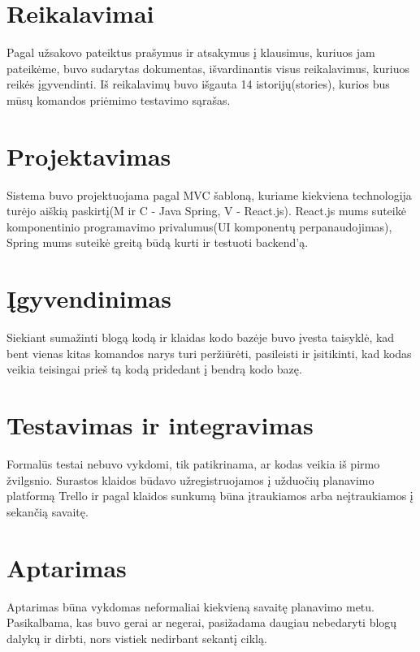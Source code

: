 \documentclass{VUMIFInfKursinis}
\begin{document}
\section{Reikalavimai}
Pagal užsakovo pateiktus prašymus ir atsakymus į klausimus, kuriuos jam pateikėme, buvo sudarytas dokumentas, išvardinantis visus reikalavimus, kuriuos reikės įgyvendinti. Iš reikalavimų buvo išgauta 14 istorijų(stories), kurios bus mūsų komandos priėmimo testavimo sąrašas.
\section{Projektavimas}
Sistema buvo projektuojama pagal MVC šabloną, kuriame kiekviena technologija turėjo aiškią paskirtį(M ir C - Java Spring, V - React.js). React.js mums suteikė komponentinio programavimo privalumus(UI komponentų perpanaudojimas), Spring mums suteikė greitą būdą kurti ir testuoti backend'ą.
\section{Įgyvendinimas}
Siekiant sumažinti blogą kodą ir klaidas kodo bazėje buvo įvesta taisyklė, kad bent vienas kitas komandos narys turi peržiūrėti, pasileisti ir įsitikinti, kad kodas veikia teisingai prieš tą kodą pridedant į bendrą kodo bazę.
\section{Testavimas ir integravimas}
Formalūs testai nebuvo vykdomi, tik patikrinama, ar kodas veikia iš pirmo žvilgsnio. Surastos klaidos būdavo užregistruojamos į užduočių planavimo platformą Trello ir pagal klaidos sunkumą būna įtraukiamos arba neįtraukiamos į sekančią savaitę.
\section{Aptarimas}
Aptarimas būna vykdomas neformaliai kiekvieną savaitę planavimo metu. Pasikalbama, kas buvo gerai ar negerai, pasižadama daugiau nebedaryti blogų dalykų ir dirbti, nors vistiek nedirbant sekantį ciklą. 
\end{document}
